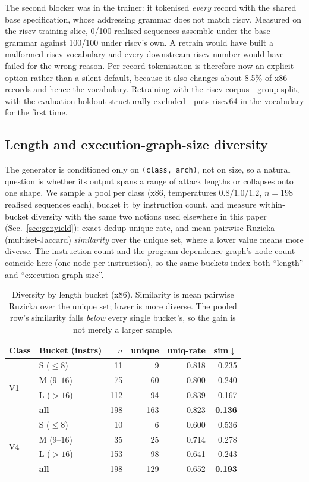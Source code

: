 \documentclass[conference]{IEEEtran}
\begin{document}
The second blocker was in the trainer: it tokenised \emph{every} record with
the shared base specification, whose addressing grammar does not match riscv.
Measured on the riscv training slice, 0/100 realised sequences assemble under
the base grammar against 100/100 under riscv's own. A retrain would have built
a malformed riscv vocabulary and every downstream riscv number would have
failed for the wrong reason. Per-record tokenisation is therefore now an
explicit option rather than a silent default, because it also changes about
8.5\% of x86 records and hence the vocabulary. Retraining with the riscv
corpus---group-split, with the evaluation holdout structurally excluded---puts
riscv64 in the vocabulary for the first time.

\subsection{Length and execution-graph-size diversity}
\label{app:lengthdiv}

The generator is conditioned only on \texttt{(class, arch)}, not on size, so a
natural question is whether its output spans a range of attack lengths or
collapses onto one shape. We sample a pool per class (x86, temperatures
$0.8/1.0/1.2$, $n{=}198$ realised sequences each), bucket it by instruction
count, and measure within-bucket diversity with the same two notions used
elsewhere in this paper (Sec.~\ref{sec:genyield}): exact-dedup unique-rate, and
mean pairwise Ruzicka (multiset-Jaccard) \emph{similarity} over the unique set,
where a lower value means more diverse. The instruction count and the program
dependence graph's node count coincide here (one node per instruction), so the
same buckets index both ``length'' and ``execution-graph size''.

\begin{table}[t]
\centering
\caption{Diversity by length bucket (x86). Similarity is mean pairwise Ruzicka
  over the unique set; lower is more diverse. The pooled row's similarity falls
  \emph{below} every single bucket's, so the gain is not merely a larger
  sample.}
\label{tab:lengthdiv}
\footnotesize
\setlength{\tabcolsep}{4pt}
\begin{tabular}{@{}llrrrr@{}}
\toprule
Class & Bucket (instrs) & $n$ & unique & uniq-rate & sim$\downarrow$ \\
\midrule
\multirow{4}{*}{V1}
 & S ($\le 8$)   & 11  & 9   & 0.818 & 0.235 \\
 & M ($9$--$16$) & 75  & 60  & 0.800 & 0.240 \\
 & L ($>16$)     & 112 & 94  & 0.839 & 0.167 \\
 & \textbf{all}  & 198 & 163 & 0.823 & \textbf{0.136} \\
\midrule
\multirow{4}{*}{V4}
 & S ($\le 8$)   & 10  & 6   & 0.600 & 0.536 \\
 & M ($9$--$16$) & 35  & 25  & 0.714 & 0.278 \\
 & L ($>16$)     & 153 & 98  & 0.641 & 0.243 \\
 & \textbf{all}  & 198 & 129 & 0.652 & \textbf{0.193} \\
\bottomrule
\end{tabular}
\end{table}
\end{document}
